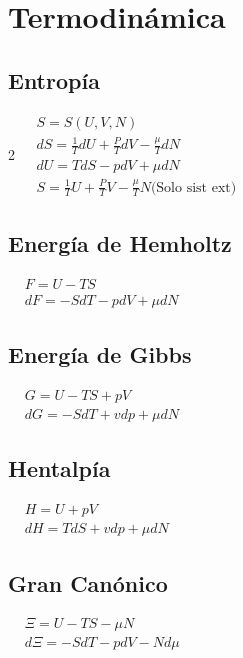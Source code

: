 \documentclass{article}
\begin{document}
\section*{Termodinámica}
\subsection{Entropía}

\begin{multicols}{2}
$
\begin{aligned}
    &S = S(U,V,N)\\
    &dS = \frac{1}{T}dU + \frac{P}{T}dV - \frac{\mu}{T}dN\\
    &dU = TdS - pdV + \mu dN \\
    &S = \frac{1}{T}U + \frac{P}{T}V - \frac{\mu}{T}N \text{(Solo sist ext)}
\end{aligned}
$

\subsection{Energía de Hemholtz}
$
\begin{aligned}
    &F = U - TS \\
    &dF = -SdT - pdV + \mu dN
\end{aligned}
$

\subsection{Energía de Gibbs}
$
\begin{aligned}
    &G = U - TS + pV \\
    &dG = -SdT + vdp + \mu dN
\end{aligned}
$

\subsection{Hentalpía}
$
\begin{aligned}
    &H = U + pV \\
    &dH = TdS + vdp + \mu dN
\end{aligned}
$

\subsection{Gran Canónico}
$
\begin{aligned}
    &\Xi = U -TS - \mu N \\
    &d\Xi = -SdT -pdV -Nd\mu
\end{aligned}
$


\end{multicols}
\end{document}
